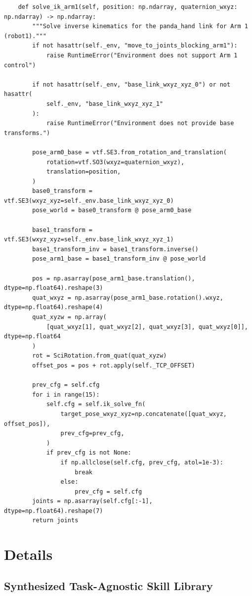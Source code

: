 \begin{lstlisting}
    def solve_ik_arm1(self, position: np.ndarray, quaternion_wxyz: np.ndarray) -> np.ndarray:
        """Solve inverse kinematics for the panda_hand link for Arm 1 (robot1)."""
        if not hasattr(self._env, "move_to_joints_blocking_arm1"):
            raise RuntimeError("Environment does not support Arm 1 control")

        if not hasattr(self._env, "base_link_wxyz_xyz_0") or not hasattr(
            self._env, "base_link_wxyz_xyz_1"
        ):
            raise RuntimeError("Environment does not provide base transforms.")

        pose_arm0_base = vtf.SE3.from_rotation_and_translation(
            rotation=vtf.SO3(wxyz=quaternion_wxyz),
            translation=position,
        )
        base0_transform = vtf.SE3(wxyz_xyz=self._env.base_link_wxyz_xyz_0)
        pose_world = base0_transform @ pose_arm0_base

        base1_transform = vtf.SE3(wxyz_xyz=self._env.base_link_wxyz_xyz_1)
        base1_transform_inv = base1_transform.inverse()
        pose_arm1_base = base1_transform_inv @ pose_world

        pos = np.asarray(pose_arm1_base.translation(), dtype=np.float64).reshape(3)
        quat_wxyz = np.asarray(pose_arm1_base.rotation().wxyz, dtype=np.float64).reshape(4)
        quat_xyzw = np.array(
            [quat_wxyz[1], quat_wxyz[2], quat_wxyz[3], quat_wxyz[0]], dtype=np.float64
        )
        rot = SciRotation.from_quat(quat_xyzw)
        offset_pos = pos + rot.apply(self._TCP_OFFSET)

        prev_cfg = self.cfg
        for i in range(15):
            self.cfg = self.ik_solve_fn(
                target_pose_wxyz_xyz=np.concatenate([quat_wxyz, offset_pos]),
                prev_cfg=prev_cfg,
            )
            if prev_cfg is not None:
                if np.allclose(self.cfg, prev_cfg, atol=1e-3):
                    break
                else:
                    prev_cfg = self.cfg
        joints = np.asarray(self.cfg[:-1], dtype=np.float64).reshape(7)
        return joints

\end{lstlisting}



\section{\sysname{} Details}
\subsection{Synthesized Task-Agnostic Skill Library}
\label{app:skill_lib}

